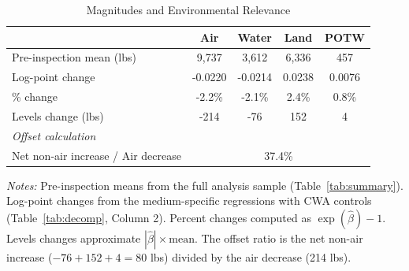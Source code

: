 \begin{table}[htbp]
\centering
\caption{Magnitudes and Environmental Relevance}
\label{tab:magnitudes}
\begin{tabular}{lcccc}
\toprule
& Air & Water & Land & POTW \\
\midrule
Pre-inspection mean (lbs) & 9,737 & 3,612 & 6,336 & 457 \\[3pt]
Log-point change & -0.0220 & -0.0214 & 0.0238 & 0.0076 \\
\% change & -2.2\% & -2.1\% & 2.4\% & 0.8\% \\[3pt]
Levels change (lbs) & -214 & -76 & 152 & 4 \\
\midrule
\multicolumn{5}{l}{\textit{Offset calculation}} \\[3pt]
Net non-air increase / Air decrease & \multicolumn{4}{c}{37.4\%} \\
\bottomrule
\end{tabular}
\begin{minipage}{0.95\textwidth}
\vspace{0.3em}
\footnotesize \textit{Notes:} Pre-inspection means from the full analysis sample (Table~\ref{tab:summary}). Log-point changes from the medium-specific regressions with CWA controls (Table~\ref{tab:decomp}, Column 2). Percent changes computed as $\exp(\hat{\beta}) - 1$. Levels changes approximate $|\hat{\beta}| \times \text{mean}$. The offset ratio is the net non-air increase ($-76 + 152 + 4 = 80$ lbs) divided by the air decrease (214 lbs).
\end{minipage}
\end{table}
